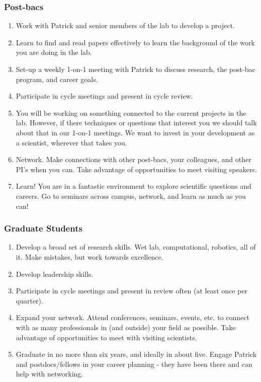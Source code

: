 \documentclass[10pt, letterpaper, twocolumn]{article} %
\begin{document}
\subsubsection{Post-bacs}
\begin{enumerate}
\item Work with Patrick and senior members of the lab to develop a project.
\item Learn to find and read papers effectively to learn the background of the work you are doing in the lab.
\item Set-up a weekly 1-on-1 meeting with Patrick to discuss research, the post-bac program, and career goals.
\item Participate in cycle meetings and present in cycle review.
\item You will be working on something connected to the current projects in the lab. However, if there techniques or questions that interest you we should talk about that in our 1-on-1 meetings. We want to invest in your development as a scientist, wherever that takes you.
\item Network. Make connections with other post-bacs, your colleagues, and other PI's when you can. Take advantage of opportunities to meet visiting speakers.
\item Learn! You are in a fantastic environment to explore scientific questions and careers. Go to seminars across campus, network, and learn as much as you can!
\end{enumerate}
\subsubsection{Graduate Students}
\begin{enumerate}
\item Develop a broad set of research skills. Wet lab, computational, robotics, all of it. Make mistakes, but work towards excellence.
\item Develop leadership skills.
\item Participate in cycle meetings and present in review often (at least once per quarter).
\item Expand your network. Attend conferences, seminars, events, etc. to connect with as many professionals in (and outside) your field as possible. Take advantage of opportunities to meet with visiting scientists.
\item Graduate in no more than six years, and ideally in about five. Engage Patrick and postdocs/fellows in your career planning - they have been there and can help with networking.
\end{enumerate}
\end{document}
